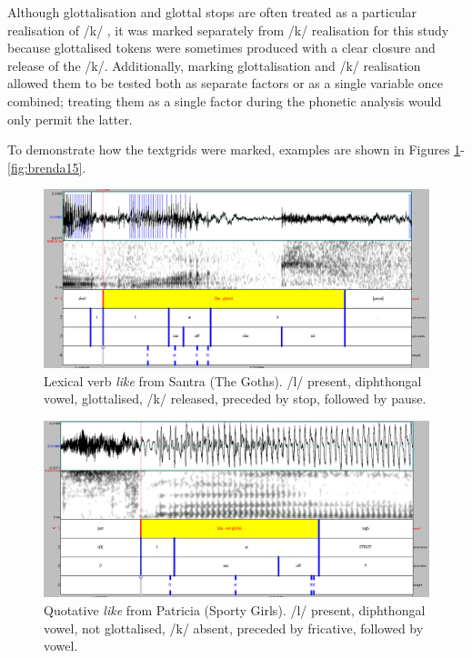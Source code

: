 \noindent Although glottalisation and glottal stops are often treated as a particular realisation of /k/ \cite{lavoie2002}, it was marked separately from /k/ realisation for this study because glottalised tokens were sometimes produced with a clear closure and release of the /k/.  Additionally, marking glottalisation and /k/ realisation allowed them to be tested both as separate factors or as a single variable once combined; treating them as a single factor during the phonetic analysis would only permit the latter. 

To demonstrate how the textgrids were marked, examples are shown in Figures \ref{fig:469santra}-\ref{fig:brenda15}.

\begin{figure}
	\centering
		\includegraphics[width=5in]{images/469santra.jpg}
		\caption{Lexical verb \textit{like} from Santra (The Goths).  /l/ present, diph\-thongal vowel, glottalised,  /k/ released, preceded by stop, followed by pause.} 
	\label{fig:469santra}
\end{figure}

\begin{figure}
	\centering
		\includegraphics[width=5in]{images/patricia74.jpg}
	\caption{Quotative \textit{like} from Patricia (Sporty Girls). /l/ present, diph\-thongal vowel, not glottalised, /k/ absent, preceded by fricative, followed by vowel.}
	\label{fig:patricia74}
\end{figure}

